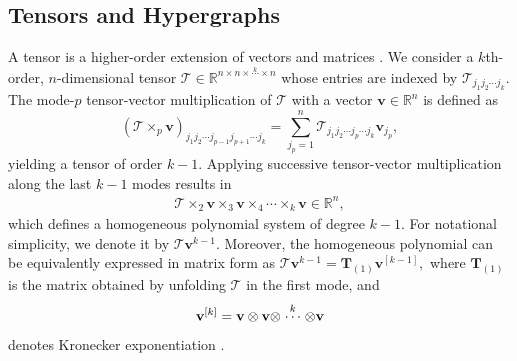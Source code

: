 \documentclass[journal,twoside,web]{ieeecolor}
\begin{document}
\subsection{Tensors and Hypergraphs}
A tensor is a higher-order extension of vectors and matrices \cite{kolda2009tensor,chen2024tensor}.
%
We consider a $k$th-order, $n$-dimensional tensor
$\mathscr{T}\in\mathbb{R}^{n\times n\times\stackrel{k}{\cdots}\times n}$ whose entries are indexed by  $\mathscr{T}_{j_1j_2\cdots j_k}$. The mode-$p$ tensor-vector multiplication of $\mathscr{T}$ with a vector $\textbf{v}\in\mathbb{R}^n$ is defined as
\begin{equation*}
(\mathscr{T} \times_{p} \textbf{v})_{j_1j_2\cdots j_{p-1}j_{p+1}\cdots j_k}=\sum_{j_p=1}^{n}\mathscr{T}_{j_1j_2\cdots j_p\cdots j_k}\textbf{v}_{j_p},
\end{equation*}
yielding a tensor of order $k-1$. 
%
Applying successive tensor-vector multiplication along the last $k-1$ modes results in
\begin{equation*}\label{eq: tensor homogeneous polynomial}
\begin{split}
\mathscr{T}\times_2 \textbf{v} \times_3\textbf{v} \times_4\cdots \times_{k}\textbf{v}\in\mathbb{R}^n,
\end{split}
\end{equation*}
which defines a homogeneous polynomial system of degree $k-1$. For notational simplicity, we denote it by $\mathscr{T}\textbf{v}^{k-1}$.
%
Moreover, the homogeneous polynomial can be equivalently expressed in matrix form as $\mathscr{T}\textbf{v}^{k-1}=\textbf{T}_{(1)}\textbf{v}^{[k-1]},$ where $\textbf{T}_{(1)}$ is the  matrix obtained by unfolding  $\mathscr{T}$ in the first mode, and
\begin{equation*}
\textbf{v}^{[k]}=\textbf v\otimes \textbf v\otimes\stackrel{k}{\cdots}\otimes \textbf v
\end{equation*}
denotes Kronecker exponentiation \cite{bellman1970introduction}.
\end{document}
